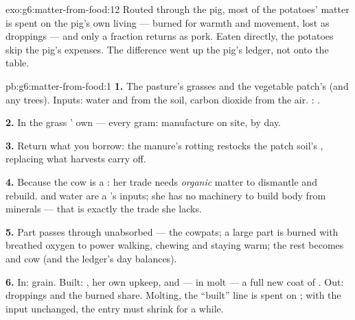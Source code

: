 \begin{solution}{exo:g6:matter-from-food:12}
Routed through the pig, most of the potatoes' matter is
spent on the pig's own living --- burned for warmth and
movement, lost as droppings --- and only a fraction returns
as pork. Eaten directly, the potatoes skip the pig's
expenses. The difference went up the pig's ledger, not onto
the table.
\end{solution}

\begin{solution}{pb:g6:matter-from-food:1}
\textbf{1.} The pasture's grasses and the vegetable patch's
 (and any  trees). Inputs: water and  from the soil, carbon dioxide from the air. :
.

\textbf{2.} In the grass ' own  --- every gram:
 manufacture on site, by day.

\textbf{3.} Return what you borrow: the manure's rotting
restocks the patch soil's , replacing what
harvests carry off.

\textbf{4.} Because the cow is a : her trade needs
\emph{organic} matter to dismantle and rebuild.  and water are a 's inputs; she has no
machinery to build body from minerals --- that is exactly
the trade she lacks.

\textbf{5.} Part passes through unabsorbed --- the cowpats;
a large part is burned with breathed oxygen to power
walking, chewing and staying warm; the rest becomes 
and cow (and the ledger's day balances).

\textbf{6.} In: grain. Built: , her own upkeep, and ---
in molt --- a full new coat of . Out: droppings and
the burned share. Molting, the ``built'' line is spent on
; with the input unchanged, the  entry must
shrink for a while.


\end{solution}
